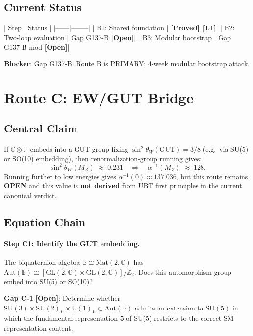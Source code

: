 \documentclass[12pt,a4paper]{article}
\theoremstyle{definition}
\theoremstyle{remark}
\newcommand{\BB}{\mathbb{B}}
\newcommand{\CC}{\mathbb{C}}
\newcommand{\HH}{\mathbb{H}}
\newcommand{\ZZ}{\mathbb{Z}}
\newcommand{\PROVED}{\textbf{[Proved]}}
\newcommand{\OPEN}{\textbf{[Open]}}
\newcommand{\Lone}{\textbf{[L1]}}
\begin{document}
\subsection{Current Status}

| Step | Status |
|------|--------|
| B1: Shared foundation | \PROVED\ \Lone |
| B2: Two-loop evaluation | Gap G137-B \OPEN |
| B3: Modular bootstrap | Gap G137-B-mod \OPEN |

\textbf{Blocker}: Gap G137-B. Route B is PRIMARY; 4-week modular bootstrap attack.

\section{Route C: EW/GUT Bridge}
\label{sec:route_c}

\subsection{Central Claim}

\begin{tcolorbox}[colback=orange!5!white,colframe=orange!60!black,
  title=Route C Target]
If $\CC\otimes\HH$ embeds into a GUT group fixing $\sin^2\theta_W(\mathrm{GUT}) = 3/8$
(e.g.\ via SU(5) or SO(10) embedding), then renormalization-group running gives:
\[
  \sin^2\theta_W(M_Z) \;\approx\; 0.231
  \quad\Longrightarrow\quad
  \alpha^{-1}(M_Z) \;\approx\; 128.
\]
Running further to low energies gives $\alpha^{-1}(0) \approx 137.036$,
but this route remains \textbf{OPEN} and this value is \textbf{not derived} from
UBT first principles in the current canonical verdict.
\end{tcolorbox}

\subsection{Equation Chain}

\paragraph{Step C1: Identify the GUT embedding.}
The biquaternion algebra $\BB \cong \mathrm{Mat}(2,\CC)$ has
$\mathrm{Aut}(\BB) \cong [\mathrm{GL}(2,\CC)\times\mathrm{GL}(2,\CC)]/\ZZ_2$.
Does this automorphism group embed into SU(5) or SO(10)?
\begin{mdframed}[backgroundcolor=yellow!15]
\textbf{Gap C-1} \OPEN: Determine whether $\mathrm{SU}(3)\times\mathrm{SU}(2)_L\times\mathrm{U}(1)_Y
\subset \mathrm{Aut}(\BB)$ admits an extension to $\mathrm{SU}(5)$ in which the
fundamental representation $\mathbf{5}$ of SU(5) restricts to the correct SM
representation content.
\end{mdframed}
\end{document}
